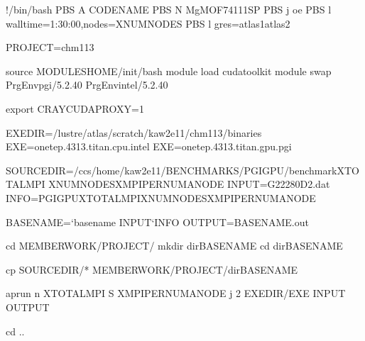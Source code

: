 \documentclass[letterpaper,10pt,english]{sphinxmanual}
\begin{document}
%
\begin{sphinxVerbatim}[commandchars=\\\{\}]
\PYGZsh{}!/bin/bash
\PYGZsh{}PBS \PYGZhy{}A CODENAME
\PYGZsh{}PBS \PYGZhy{}N MgMOF74\PYGZus{}111\PYGZus{}SP
\PYGZsh{}PBS \PYGZhy{}j oe
\PYGZsh{}PBS \PYGZhy{}l walltime=1:30:00,nodes=XNUMNODES
\PYGZsh{}PBS \PYGZhy{}l gres=atlas1\PYGZpc{}atlas2

PROJECT=chm113

source \PYGZdl{}MODULESHOME/init/bash
module load cudatoolkit
\PYGZsh{}module swap PrgEnv\PYGZhy{}pgi/5.2.40 PrgEnv\PYGZhy{}intel/5.2.40

export CRAY\PYGZus{}CUDA\PYGZus{}PROXY=1

EXEDIR=/lustre/atlas/scratch/kaw2e11/chm113/binaries
\PYGZsh{}EXE=onetep.4313.titan.cpu.intel
EXE=onetep.4313.titan.gpu.pgi

\PYGZsh{}\PYGZsh{}\PYGZsh{}\PYGZsh{}\PYGZsh{}\PYGZsh{}\PYGZsh{}\PYGZsh{}\PYGZsh{}\PYGZsh{}\PYGZsh{}\PYGZsh{}\PYGZsh{}\PYGZsh{}\PYGZsh{}\PYGZsh{}\PYGZsh{}\PYGZsh{}\PYGZsh{}\PYGZsh{}\PYGZsh{}\PYGZsh{}\PYGZsh{}\PYGZsh{}\PYGZsh{}\PYGZsh{}\PYGZsh{}\PYGZsh{}\PYGZsh{}\PYGZsh{}\PYGZsh{}\PYGZsh{}\PYGZsh{}\PYGZsh{}\PYGZsh{}\PYGZsh{}\PYGZsh{}\PYGZsh{}\PYGZsh{}\PYGZsh{}\PYGZsh{}\PYGZsh{}
SOURCEDIR=/ccs/home/kaw2e11/BENCHMARKS/PGI\PYGZus{}GPU/benchmark\PYGZhy{}XTOTALMPI\PYGZhy{}\PYGZbs{}
XNUMNODES\PYGZhy{}XMPIPERNUMANODE
INPUT=G\PYGZus{}222\PYGZus{}80\PYGZus{}D2.dat
INFO=PGI\PYGZus{}GPU\PYGZhy{}XTOTALMPI\PYGZhy{}XNUMNODES\PYGZhy{}XMPIPERNUMANODE
\PYGZsh{}\PYGZsh{}\PYGZsh{}\PYGZsh{}\PYGZsh{}\PYGZsh{}\PYGZsh{}\PYGZsh{}\PYGZsh{}\PYGZsh{}\PYGZsh{}\PYGZsh{}\PYGZsh{}\PYGZsh{}\PYGZsh{}\PYGZsh{}\PYGZsh{}\PYGZsh{}\PYGZsh{}\PYGZsh{}\PYGZsh{}\PYGZsh{}\PYGZsh{}\PYGZsh{}\PYGZsh{}\PYGZsh{}\PYGZsh{}\PYGZsh{}\PYGZsh{}\PYGZsh{}\PYGZsh{}\PYGZsh{}\PYGZsh{}\PYGZsh{}\PYGZsh{}\PYGZsh{}\PYGZsh{}\PYGZsh{}\PYGZsh{}\PYGZsh{}\PYGZsh{}\PYGZsh{}

BASENAME={}`basename \PYGZdl{}INPUT{}`\PYGZhy{}\PYGZdl{}INFO
OUTPUT=\PYGZdl{}BASENAME.out

cd \PYGZdl{}MEMBERWORK/\PYGZdl{}PROJECT/
mkdir dir\PYGZhy{}\PYGZdl{}BASENAME
cd dir\PYGZhy{}\PYGZdl{}BASENAME

cp \PYGZdl{}SOURCEDIR/* \PYGZdl{}MEMBERWORK/\PYGZdl{}PROJECT/dir\PYGZhy{}\PYGZdl{}BASENAME

aprun \PYGZhy{}n XTOTALMPI \PYGZhy{}S XMPIPERNUMANODE \PYGZhy{}j 2 \PYGZdl{}EXEDIR/\PYGZdl{}EXE \PYGZdl{}INPUT \PYGZam{}\PYGZgt{} \PYGZdl{}OUTPUT

cd ..
\end{sphinxVerbatim}
\end{document}
